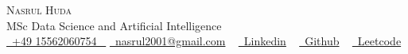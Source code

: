 \begin{center}
    {\Huge \scshape Nasrul Huda} \\ \vspace{1pt}
   MSc Data Science and Artificial Intelligence \\ \vspace{4pt}
    \small \href{tel:+917289968427}{\faMobile*\ +49 15562060754 ~} \href{mailto:nasrul2001@gmail.com}{\faEnvelope\  nasrul2001@gmail.com} ~ 
    \href{https://www.linkedin.com/in/nasrul-hudaa/}{\faLinkedin\ Linkedin}  ~
    \href{https://github.com/nnayz}{\faGithub\ Github} ~
    \href{https://leetcode.com/u/nnasrull/}{\faLink\ Leetcode}  ~
\end{center}
